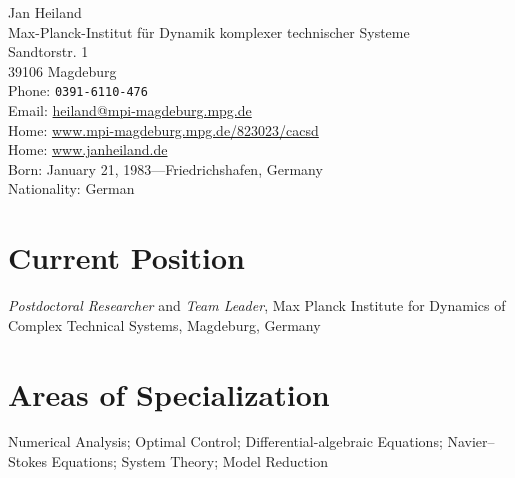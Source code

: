 \documentclass[11pt, a4paper]{article} %
\begin{document}
\sffamily

{\LARGE Jan Heiland}\\[1cm] %
Max-Planck-Institut f\"ur Dynamik komplexer technischer Systeme\\ %
Sandtorstr. 1\\
39106 Magdeburg \\[.2cm]
Phone: \texttt{0391-6110-476}\\ [.2cm]
Email: \href{mailto:heiland@mpi-magdeburg.mpg.de}{heiland@mpi-magdeburg.mpg.de}\\ %
Home: \href{http://www.mpi-magdeburg.mpg.de/823023/cacsd}{www.mpi-magdeburg.mpg.de/823023/cacsd}\\ %
Home: \href{http://www.janheiland.de}{www.janheiland.de}\\[.3in] %



Born: January 21, 1983---Friedrichshafen, Germany\\ %
Nationality: German


\section*{Current Position}

\emph{Postdoctoral Researcher} and \emph{Team Leader}, Max Planck Institute for Dynamics of Complex Technical Systems, Magdeburg, Germany %


\section*{Areas of Specialization}

Numerical Analysis; Optimal Control; Differential-algebraic Equations; Navier--Stokes Equations; System Theory; Model Reduction

\end{document}
